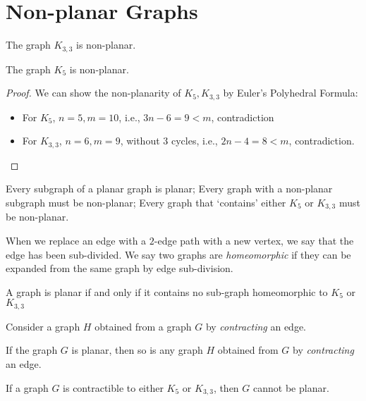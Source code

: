 \section{Non-planar Graphs}
\begin{theorem}
The graph $K_{3,3}$ is non-planar.
\end{theorem}
\begin{theorem}
The graph $K_5$ is non-planar.
\end{theorem}
\begin{proof}
We can show the non-planarity of $K_5,K_{3,3}$ by Euler’s Polyhedral Formula:
\begin{itemize}
\item
For $K_5$, $n=5,m=10$, i.e., $3n-6=9<m$, contradiction
\item
For $K_{3,3}$, $n=6,m=9$, without $3$ cycles, i.e., $2n-4=8<m$, contradiction.
\end{itemize}
\end{proof}
\begin{remark}
Every subgraph of a planar graph is planar;
Every graph with a non-planar subgraph must be non-planar;
Every graph that ‘contains’ either $K_5$ or $K_{3,3}$ must be non-planar.
\end{remark}

\begin{definition}[homeomorphism]
When we replace an edge with a $2$-edge path with a new vertex, we say that the edge has been sub-divided.
We say two graphs are \emph{homeomorphic} if they can be expanded from the same graph by edge sub-division.
\end{definition}

\begin{theorem}
A graph is planar if and only if it contains no sub-graph homeomorphic to $K_5$ or $K_{3,3}$
\end{theorem}

Consider a graph $H$ obtained from a graph $G$ by \emph{contracting} an edge.
\begin{lemma}
If the graph $G$ is planar, then so is any graph $H$ obtained from $G$ by \emph{contracting} an edge.
\end{lemma}
\begin{theorem}
If a graph $G$ is contractible to either $K_5$ or $K_{3,3}$, then $G$ cannot be planar.
\end{theorem}
